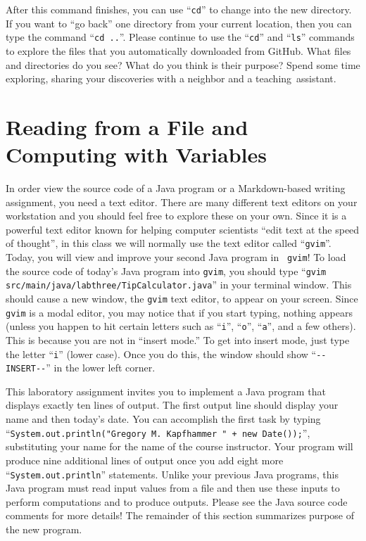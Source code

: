 \documentclass[11pt]{article}
\newcommand{\command}[1]{``\lstinline{#1}''}
\newcommand{\program}[1]{\lstinline{#1}}
\newcommand{\step}[1]{``{#1}''}
\begin{document}
After this command finishes, you can use \command{cd} to change into the new directory. If you want to \step{go back}
one directory from your current location, then you can type the command \command{cd ..}. Please continue to use the
\command{cd} and \command{ls} commands to explore the files that you automatically downloaded from GitHub. What files
and directories do you see? What do you think is their purpose? Spend some time exploring, sharing your discoveries with
a neighbor and a \mbox{teaching assistant}.

\section*{Reading from a File and Computing with Variables}

In order view the source code of a Java program or a Markdown-based writing assignment, you need a text editor. There
are many different text editors on your workstation and you should feel free to explore these on your own. Since it is a
powerful text editor known for helping computer scientists ``edit text at the speed of thought'', in this class we will
normally use the text editor called \command{gvim}. Today, you will view and improve your second Java program in {\tt
  gvim}! To load the source code of today's Java program into \program{gvim}, you should type \command{gvim
src/main/java/labthree/TipCalculator.java} in your terminal window. This should cause a new window, the \program{gvim}
text editor, to appear on your screen. Since \program{gvim} is a modal editor, you may notice that if you start typing,
nothing appears (unless you happen to hit certain letters such as \command{i}, \command{o}, \command{a}, and a few
others). This is because you are not in ``insert mode.'' To get into insert mode, just type the letter \command{i}
(lower case). Once you do this, the window should show \command{--INSERT--} in the lower left corner.

This laboratory assignment invites you to implement a Java program that displays exactly ten lines of output. The first
output line should display your name and then today's date. You can accomplish the first task by typing
\command{System.out.println("Gregory M. Kapfhammer " + new Date());}, substituting your name for the name of the course
instructor. Your program will produce nine additional lines of output once you add eight more
\command{System.out.println} statements. Unlike your previous Java programs, this Java program must read input values
from a file and then use these inputs to perform computations and to produce outputs. Please see the Java source code
comments for more details! The remainder of this section summarizes purpose of the new program.
\end{document}
